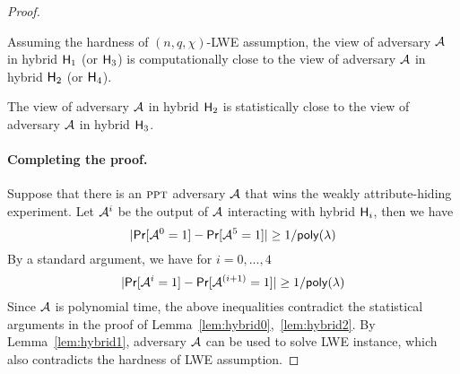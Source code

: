 \begin{proof}
\begin{lemma}\label{lem:hybrid1}
Assuming the hardness of $(n, q, \chi)$-LWE assumption, the view of adversary $\mathcal{A}$ in hybrid $\mathsf{H}_1$ (or $\mathsf{H}_3$) is computationally close to the view of adversary $\mathcal{A}$ in hybrid $\mathsf{H}_2$ (or $\mathsf{H}_4$).
\end{lemma}


\begin{lemma}\label{lem:hybrid2}
The view of adversary $\mathcal{A}$ in hybrid $\mathsf{H}_2$ is statistically close to the view of adversary $\mathcal{A}$ in hybrid $\mathsf{H}_3$.
\end{lemma}


\paragraph{Completing the proof.}Suppose that there is an $\textsc{ppt}$ adversary $\mathcal{A}$ that wins the weakly attribute-hiding experiment. Let $\mathcal{A}^i$ be the output of $\mathcal{A}$ interacting with hybrid $\mathsf{H}_i$, then we have
$$|\mathsf{Pr}[\mathcal{A}^0 = 1] - \mathsf{Pr}[\mathcal{A}^5 = 1]| \geq 1 / \mathsf{poly}(\lambda)$$
By a standard argument, we have for $i = 0,..., 4$
$$|\mathsf{Pr}[\mathcal{A}^i = 1] - \mathsf{Pr}[\mathcal{A}^{(i + 1)} = 1]| \geq 1 / \mathsf{poly}(\lambda)$$
Since $\mathcal{A}$ is polynomial time, the above inequalities contradict the statistical arguments in the proof of Lemma~\ref{lem:hybrid0},~\ref{lem:hybrid2}. By Lemma~\ref{lem:hybrid1}, adversary $\mathcal{A}$ can be used to solve LWE instance, which also contradicts the hardness of LWE assumption.

\end{proof}

